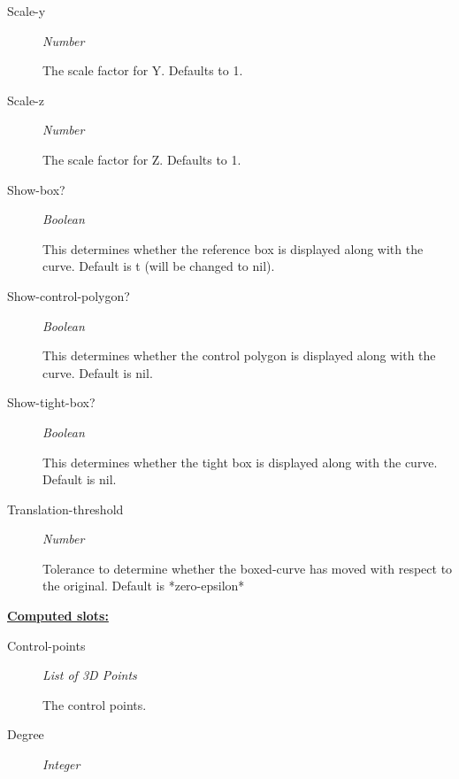 \documentclass [11pt]{book}
\begin{document}
\begin{itemize}
\begin{description}
\item [Scale-y]
\emph{Number}

 The scale factor for Y. Defaults to 1.




\item [Scale-z]
\emph{Number}

 The scale factor for Z. Defaults to 1.




\item [Show-box?]
\emph{Boolean}

 This determines whether the reference box is displayed along with the curve. Default is t (will be changed to nil).




\item [Show-control-polygon?]
\emph{Boolean}

 This determines whether the control polygon is displayed along with the curve. Default is nil.




\item [Show-tight-box?]
\emph{Boolean}

 This determines whether the tight box is displayed along with the curve. Default is nil.




\item [Translation-threshold]
\emph{Number}

 Tolerance to determine whether the boxed-curve has
moved with respect to the original. Default is *zero-epsilon*




\end{description}






\textbf{
\underline{Computed slots:}}

\begin{description}

\item [Control-points]
\emph{List of 3D Points}

 The control points.




\item [Degree]
\emph{Integer}


\end{description}
\end{itemize}
\end{document}
